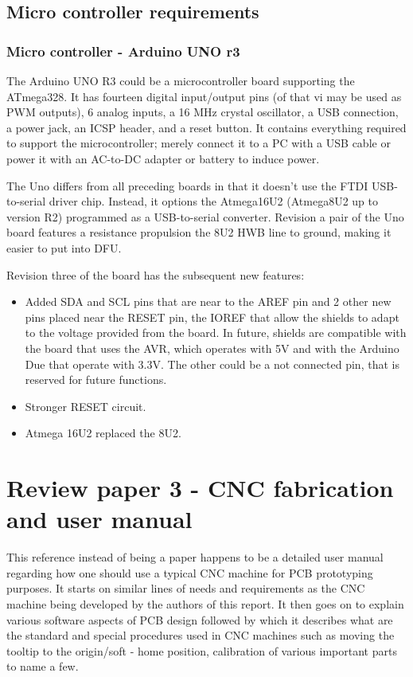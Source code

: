 \subsection{Micro controller requirements}

\subsubsection*{Micro controller - Arduino UNO r3}
The Arduino UNO R3 could be a microcontroller board supporting the ATmega328. It has fourteen digital input/output pins (of that vi may be used as PWM outputs), 6 analog inputs, a 16 MHz crystal oscillator, a USB connection, a power jack, an ICSP header, and a reset button. It contains everything required to support the microcontroller; merely connect it to a PC with a USB cable or power it with an AC-to-DC adapter or battery to induce power. \par

The Uno differs from all preceding boards in that it doesn't use the FTDI USB-to-serial driver chip. Instead, it options the Atmega16U2 (Atmega8U2 up to version R2) programmed as a USB-to-serial converter.
Revision a pair of the Uno board features a resistance propulsion the 8U2 HWB line to ground, making it easier to put into DFU.

Revision three of the board has the subsequent new features:

\begin{itemize}
 \item Added SDA and SCL pins that are near to the AREF pin and 2 other new pins placed near the RESET pin, the IOREF that allow the shields to adapt to the voltage provided from the board. In future, shields are compatible with the board that uses the AVR, which operates with 5V and with the Arduino Due that operate with 3.3V. The other could be a not connected pin, that is reserved for future functions.
 \item Stronger RESET circuit.
 \item Atmega 16U2 replaced the 8U2.
\end{itemize}


\section{Review paper 3 - CNC fabrication and user manual} \label{Sec:3} 

This reference \cite{iiit_pap} instead of being a paper happens to be a detailed user manual regarding how one should use a typical CNC machine for PCB prototyping purposes. It starts on similar lines of needs and requirements as the CNC machine being developed by the authors of this report. It then goes on to explain various software aspects of PCB design followed by which it describes what are the standard and special procedures used in CNC machines such as moving the tooltip to the origin/soft - home position, calibration of various important parts to name a few. \par

